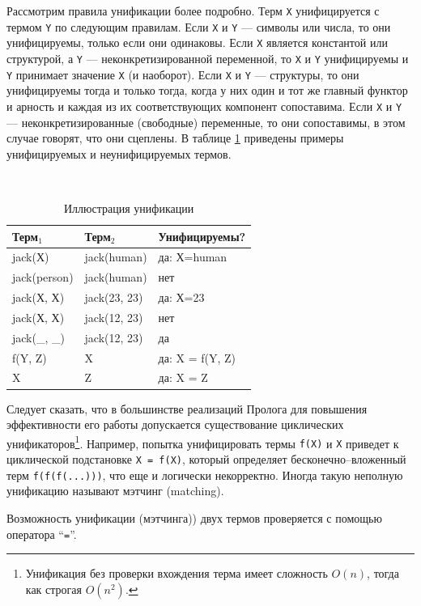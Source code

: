 \documentclass[12pt, openany, twoside]{book} %
\begin{document}
Рассмотрим правила унификации более подробно. Терм {\tt X} унифицируется с термом {\tt Y} по следующим правилам. Если {\tt Х} и {\tt Y} --- символы или числа, то они унифицируемы, только если они одинаковы. Если {\tt Х} является константой или структурой, а {\tt Y} --- неконкретизированной переменной, то {\tt Х} и {\tt Y} унифицируемы и {\tt Y} принимает значение {\tt Х} (и наоборот). Если {\tt Х} и {\tt Y} --- структуры, то они унифицируемы тогда и только тогда, когда у них один и тот же главный функтор и арность и каждая из их соответствующих компонент сопоставима. Если {\tt Х} и {\tt Y} --- неконкретизированные (свободные) переменные, то они сопоставимы, в этом случае говорят, что они сцеплены. В таблице \ref{tab:unif} приведены примеры унифицируемых и неунифицируемых термов.

\begin{table}[ht]
\begin{center}\tt
\begin{tabular}{|l|l|l|}
 \hline
 {\rm Терм${}_1$} & {\rm Терм${}_2$}  &  {\rm Унифицируемы?}
 \\\hline\hline
 jack(Х)  &  jack(human) & {\rm да:} Х=human
 \\\hline
 jack(person) & jack(human)  &  {\rm нет}
 \\\hline
 jack(Х, Х) & jack(23, 23)  &  {\rm да:} Х=23
 \\\hline
 jack(Х, Х) & jack(12, 23)  &  {\rm нет}
 \\\hline
 jack(\_, \_) & jack(12, 23)  &  {\rm да}
 \\\hline
 f(Y, Z) & X  &  {\rm да:} X = f(Y, Z)
  \\\hline
 X & Z  &  {\rm да:} X = Z
  \\\hline
\end{tabular}
\end{center}
\caption{Иллюстрация унификации} \label{tab:unif}
\end{table}

Следует сказать, что в большинстве реализаций Пролога для повышения эффективности его работы допускается существование циклических унификаторов\footnote{Унификация без проверки вхождения терма имеет сложность $O(n)$, тогда как строгая $O(n^2)$.}. Например, попытка унифицировать термы {\tt f(X)} и {\tt Х} приведет к циклической подстановке {\tt X = f(X)}, который определяет бесконечно--вложенный терм {\tt f(f(f(...)))}, что еще и логически некорректно. Иногда такую неполную унификацию называют мэтчинг (matching).

Возможность унификации (мэтчинга)) двух термов проверяется с помощью оператора ``{\tt =}''.
\end{document}
